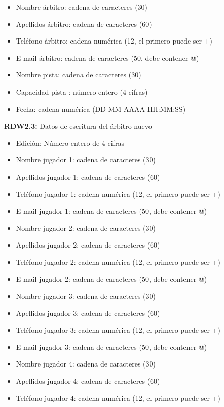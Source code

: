 \begin{itemize}
	\item Nombre árbitro: cadena de caracteres (30)
	\item Apellidos árbitro: cadena de caracteres (60)
	\item Teléfono árbitro: cadena numérica (12, el primero puede ser +)
	\item E-mail árbitro: cadena de caracteres (50, debe contener @)
\newline
	\item Nombre pista: cadena de caracteres (30)
	\item Capacidad pista : número entero (4 cifras)
	\item Fecha: cadena numérica (DD-MM-AAAA HH:MM:SS)
\end{itemize}

\textbf{RDW2.3:} Datos de escritura del árbitro nuevo
\begin{itemize}
	\item Edición: Número entero de 4 cifras
\newline
	\item Nombre jugador 1: cadena de caracteres (30)
	\item Apellidos jugador 1: cadena de caracteres (60)
	\item Teléfono jugador 1: cadena numérica (12, el primero puede ser +)
	\item E-mail jugador 1: cadena de caracteres (50, debe contener @)
\newline
	\item Nombre jugador 2: cadena de caracteres (30)
	\item Apellidos jugador 2: cadena de caracteres (60)
	\item Teléfono jugador 2: cadena numérica (12, el primero puede ser +)
	\item E-mail jugador 2: cadena de caracteres (50, debe contener @)
\newline
	\item Nombre jugador 3: cadena de caracteres (30)
	\item Apellidos jugador 3: cadena de caracteres (60)
	\item Teléfono jugador 3: cadena numérica (12, el primero puede ser +)
	\item E-mail jugador 3: cadena de caracteres (50, debe contener @)
\newline
	\item Nombre jugador 4: cadena de caracteres (30)
	\item Apellidos jugador 4: cadena de caracteres (60)
	\item Teléfono jugador 4: cadena numérica (12, el primero puede ser +)

\end{itemize}
